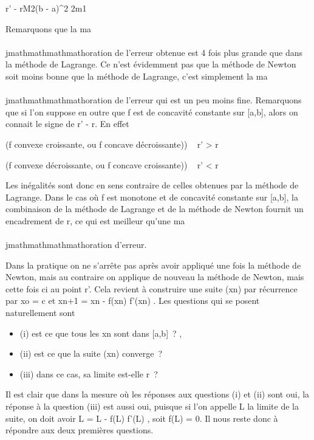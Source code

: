 \textbar{}r' - r\textbar{}\leq M2(b - a)^2
\over 2m1

Remarquons que la ma\\\\jmathmathmathmathoration de l'erreur obtenue est 4 fois plus grande
que dans la méthode de Lagrange. Ce n'est évidemment pas que la méthode
de Newton soit moins bonne que la méthode de Lagrange, c'est simplement
la ma\\\\jmathmathmathmathoration de l'erreur qui est un peu moins fine. Remarquons que si
l'on suppose en outre que f est de concavité constante sur {[}a,b{]},
alors on connait le signe de r' - r. En effet

(f convexe croissante, ou f concave décroissante)) \rigtharrow~ r' \textgreater{} r

(f convexe décroissante, ou f concave croissante)) \rigtharrow~ r' \textless{} r

Les inégalités sont donc en sens contraire de celles obtenues par la
méthode de Lagrange. Dans le cas où f est monotone et de concavité
constante sur {[}a,b{]}, la combinaison de la méthode de Lagrange et de
la méthode de Newton fournit un encadrement de r, ce qui est meilleur
qu'une ma\\\\jmathmathmathmathoration d'erreur.

Dans la pratique on ne s'arrête pas après avoir appliqué une fois la
méthode de Newton, mais au contraire on applique de nouveau la méthode
de Newton, mais cette fois ci au point r'. Cela revient à construire une
suite (xn) par récurrence par xo = c et
xn+1 = xn - f(xn) \over
f'(xn) . Les questions qui se posent naturellement sont

\begin{itemize}
\itemsep1pt\parskip0pt
\item
  (i) est ce que tous les xn sont dans {[}a,b{]}~? ,
\item
  (ii) est ce que la suite (xn) converge~?
\item
  (iii) dans ce cas, sa limite est-elle r~?
\end{itemize}

Il est clair que dans la mesure où les réponses aux questions (i) et
(ii) sont oui, la réponse à la question (iii) est aussi oui, puisque si
l'on appelle L la limite de la suite, on doit avoir L = L - f(L)
\over f'(L) , soit f(L) = 0. Il nous reste donc à
répondre aux deux premières questions.

